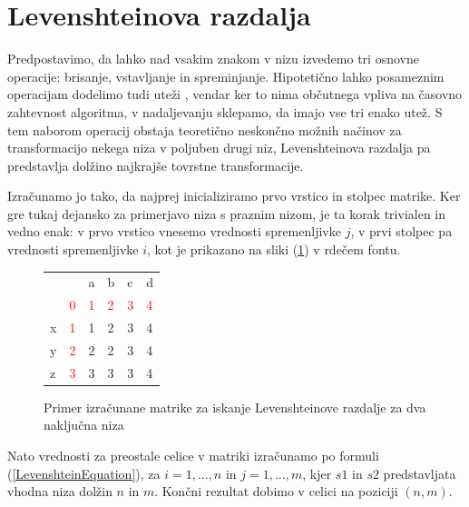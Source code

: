 \documentclass[a4paper,12pt,openright]{book}
\begin{document}
\section{Levenshteinova razdalja}

Predpostavimo, da lahko nad vsakim znakom v nizu izvedemo tri osnovne operacije: brisanje, vstavljanje in spreminjanje. Hipotetično lahko posameznim operacijam dodelimo tudi uteži \cite{weightedLevenshtein}, vendar ker to nima občutnega vpliva na časovno zahtevnost algoritma, v nadaljevanju sklepamo, da imajo vse tri enako utež. S tem naborom operacij obstaja teoretično neskončno možnih načinov za transformacijo nekega niza v poljuben drugi niz, Levenshteinova razdalja pa predstavlja dolžino najkrajše tovrstne transformacije. 

Izračunamo jo tako, da najprej inicializiramo prvo vrstico in stolpec matrike. Ker gre tukaj dejansko za primerjavo niza s praznim nizom, je ta korak trivialen in vedno enak: v prvo vrstico vnesemo vrednosti spremenljivke $j$, v prvi stolpec pa vrednosti spremenljivke $i$, kot je prikazano na sliki (\ref{levenshteinExample}) v rdečem fontu.

\begin{figure}[htb]
\begin{center}
\begin{tabular}{|l|l|l|l|l|l|}
\cline{3-6}
  \multicolumn{2}{c|}{}  & a & b & c & d\\ \cline{2-6}
 \multicolumn{1}{c|}{} & \textcolor{red}{0} & \textcolor{red}{1} & \textcolor{red}{2} & \textcolor{red}{3} & \textcolor{red}{4}\\ \hline
x  & \textcolor{red}{1}  & \cellcolor{blue!15}1 &  2 & 3 & 4\\ \hline
y  & \textcolor{red}{2} & 2 & \cellcolor{blue!15}2 & 3 & 4\\ \hline
z  & \textcolor{red}{3} & 3 & 3 & \cellcolor{blue!15}3 & \cellcolor{blue!25}4 \\ \hline
\end{tabular}

\end{center}
\caption{Primer izračunane matrike za iskanje Levenshteinove razdalje za dva naključna niza}
\label{levenshteinExample}
\end{figure}

Nato vrednosti za preostale celice v matriki izračunamo po formuli (\ref{LevenshteinEquation}), za $i=1,...,n$ in $j=1,...,m$, kjer $s1$ in $s2$ predstavljata vhodna niza dolžin $n$ in $m$. Končni rezultat dobimo v celici na poziciji $(n, m)$. 
\end{document}
